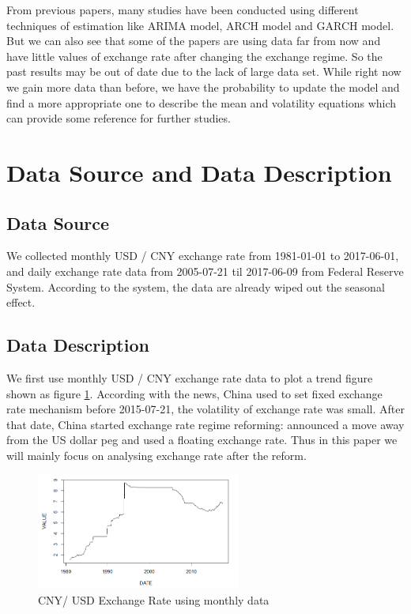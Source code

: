\documentclass[12pt, a4paper, titlepage]{article}
\begin{document}
From previous papers, many studies have been conducted using different techniques of estimation like ARIMA model, ARCH model and GARCH model. But we can also see that some of the papers are using data far from now and have little values of exchange rate after changing the exchange regime. So the past results may be out of date due to the lack of large data set. While right now we gain more data than before, we have the probability to update the model and find a more appropriate one to describe the mean and volatility equations which can provide some reference for further studies.\\

\section{Data Source and Data Description}
\subsection{Data Source}
We collected monthly USD / CNY exchange rate from 1981-01-01 to 2017-06-01, and daily exchange rate data from 2005-07-21 til 2017-06-09 from Federal Reserve System. According to the system, the data are already wiped out the seasonal effect.\\

\subsection{Data Description}
We first use monthly USD / CNY exchange rate data  to plot a trend figure shown as figure \ref{monthly}. According with the news, China used to set fixed exchange rate mechanism before 2015-07-21, the volatility of exchange rate was small. After that date, China started exchange rate regime reforming: announced a move away from the US dollar peg and used a floating exchange rate. Thus in this paper we will mainly focus on analysing exchange rate after the reform.\\ 
\begin{figure}[h!]
\begin{center}
\caption{CNY/ USD Exchange Rate using monthly data}\label{monthly}
\includegraphics[width=0.6\textwidth]{monthly.png} 
\end{center}
\end{figure}
\end{document}
